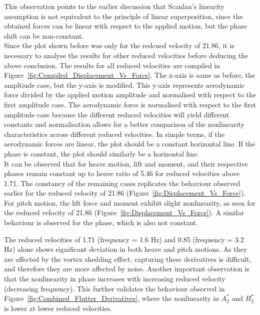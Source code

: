 \documentclass[a4paper, 12pt]{report}
\begin{document}
This observation points to the earlier discussion that Scanlan's linearity assumption is not equivalent to the principle of linear superposition, 
since the obtained forces can be linear with respect to the applied motion, but the phase shift can be non-constant. \\

Since the plot shown before was only for the redcued velocity of 21.86, it is necessary to analyse the results for other reduced 
velocities before deducing the above conclusion. The results for all reduced velocities are compiled in Figure~\ref{fig:Compiled_Displacement_Vs_Force}. 
The x-axis is same as before, the ampltiude case, but the y-axis is modified.
This y-axis represents aerodynamic force divided by the applied motion amplitude and normalised with respect to the first amplitude case. 
The aerodynamic force is normalised with respect to the first amplitude case because the different reduced velocities will yield different constants 
and normalisation allows for a better comparison of the nonlinearity characteristics across different reduced velocities.
In simple terms, if the aerodynamic forces are linear, the plot should be a constant horizontal line. If the phase is constant, 
the plot should similarly be a horizontal line.\\
    
It can be observed that for heave motion, lift and moment, and their respective phases remain constant up to heave ratio of 5.46 
for reduced velocities above 1.71. 
The constancy of the remaining cases replicates the behaviour observed earlier for the reduced velocity of 21.86
(Figure~\ref{fig:Displacement_Vs_Force}). For pitch motion, the lift force and moment exhibit slight nonlinearity, 
as seen for the reduced velocity of 21.86 (Figure~\ref{fig:Displacement_Vs_Force}).  
A similar behaviour is observed for the phase, which is also not constant. 

The reduced velocities of 1.71 (frequency = 1.6 Hz) and 0.85 (frequency = 3.2 Hz) alone shows significant deviation 
in both heave and pitch motions.  
As they are affected by the vortex shedding effect, capturing these derivatives is difficult, and therefore they 
are more affected by noise.
Another important observation is that the nonlinearity in phase increases with increasing reduced velocity (decreasing frequency).
This further validates the behaviour observed in Figure~\ref{fig:Combined_Flutter_Derivatives}, where the nonlinearity in $A_2^*$ and $H_2^*$ is lower at lower reduced velocities. \\
\end{document}
